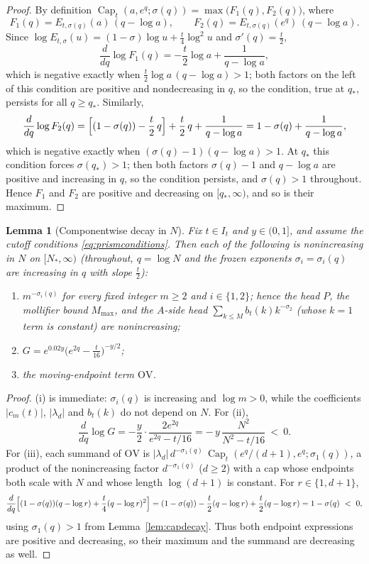 \documentclass[11pt]{article}
\newtheorem{lemma}[theorem]{Lemma}
\theoremstyle{definition}
\newcommand{\CapT}{\operatorname{Cap}}
\begin{document}
\begin{proof}
By definition
$\CapT_t(a,e^q;\sigma(q))=\max\bigl(F_1(q),F_2(q)\bigr)$, where
\[
F_1(q)=E_{t,\sigma(q)}(a)\,(q-\log a),
\qquad
F_2(q)=E_{t,\sigma(q)}(e^q)\,(q-\log a).
\]
Since $\log E_{t,\sigma}(u)=(1-\sigma)\log u+\frac t4\log^2u$ and
$\sigma'(q)=\frac t2$,
\[
\frac{d}{dq}\log F_1(q)
=-\frac t2\log a+\frac1{q-\log a},
\]
which is negative exactly when
$\frac t2\log a\,(q-\log a)>1$; both factors on the left of this
condition are positive and nondecreasing in $q$, so the condition,
true at $q_*$, persists for all $q\ge q_*$. Similarly,
\[
\frac{d}{dq}\log F_2(q)
=\Bigl[(1-\sigma(q))-\frac t2\,q\Bigr]+\frac t2\,q
+\frac1{q-\log a}
=1-\sigma(q)+\frac1{q-\log a},
\]
which is negative exactly when $(\sigma(q)-1)(q-\log a)>1$. At
$q_*$ this condition forces $\sigma(q_*)>1$; then both factors
$\sigma(q)-1$ and $q-\log a$ are positive and increasing in $q$,
so the condition persists, and $\sigma(q)>1$ throughout. Hence
$F_1$ and $F_2$ are positive and decreasing on $[q_*,\infty)$, and
so is their maximum.
\end{proof}

\begin{lemma}[Componentwise decay in $N$]\label{lem:compdecay}
Fix $t\in I_t$ and $y\in(0,1]$, and assume the cutoff conditions
\eqref{eq:prismconditions}. Then each of the following is nonincreasing in
$N$ on $[N_*,\infty)$ (throughout, $q=\log N$ and the frozen
exponents $\sigma_i=\sigma_i(q)$ are increasing in $q$ with slope
$\frac t2$):
\begin{enumerate}
\item[\textup{(i)}] $m^{-\sigma_i(q)}$ for every fixed integer
$m\ge2$ and $i\in\{1,2\}$; hence the head $P$, the mollifier
bound $M_{\max}$, and the $A$-side head
$\sum_{k\le M}b_t(k)k^{-\sigma_2}$ (whose $k=1$ term is constant)
are nonincreasing;
\item[\textup{(ii)}] $G=e^{0.02y}\bigl(e^{2q}-\frac t{16}\bigr)^{-y/2}$;
\item[\textup{(iii)}] the moving-endpoint term $\mathrm{OV}$.
\end{enumerate}
\end{lemma}

\begin{proof}
(i) is immediate: $\sigma_i(q)$ is increasing and $\log m>0$,
while the coefficients $|c_m(t)|$, $|\lambda_d|$ and $b_t(k)$ do
not depend on $N$. For (ii),
\[
\frac{d}{dq}\log G
=-\frac y2\cdot\frac{2e^{2q}}{e^{2q}-t/16}
=-\,y\,\frac{N^2}{N^2-t/16}\ <\ 0 .
\]
For (iii), each summand of $\mathrm{OV}$ is
$|\lambda_d|\,d^{-\sigma_1(q)}\,
\CapT_t(e^q/(d+1),e^q;\sigma_1(q))$, a product of the
nonincreasing factor $d^{-\sigma_1(q)}$ ($d\ge2$) with a cap whose
endpoints both scale with $N$ and whose length $\log(d+1)$ is
constant. For $r\in\{1,d+1\}$,
\[
\frac{d}{dq}\Bigl[(1-\sigma(q))(q-\log r)
+\frac t4(q-\log r)^2\Bigr]
=(1-\sigma(q))-\frac t2(q-\log r)+\frac t2(q-\log r)
=1-\sigma(q)\ <\ 0,
\]
using $\sigma_1(q)>1$ from Lemma~\ref{lem:capdecay}. Thus both endpoint
expressions are positive and decreasing, so their maximum and the summand are
decreasing as well.
\end{proof}
\end{document}
